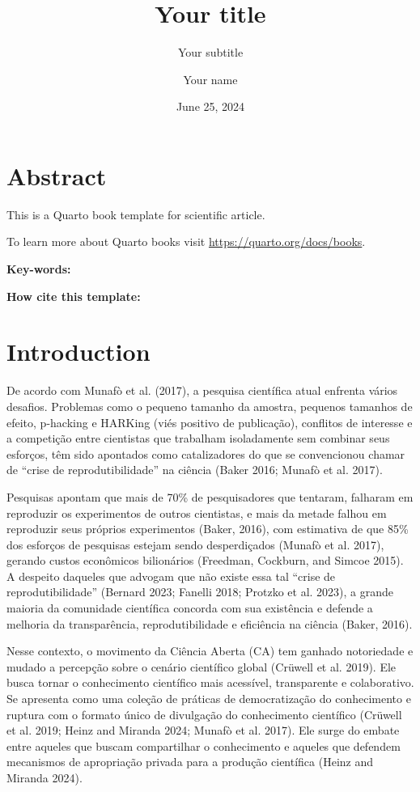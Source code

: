 \documentclass[
  a4paper,
]{article}
\title{Your title}
\subtitle{Your subtitle}
\author{Your name}
\date{June 25, 2024}
\begin{document}
\maketitle


\section*{Abstract}\label{abstract}


This is a Quarto book template for scientific article.

To learn more about Quarto books visit
\url{https://quarto.org/docs/books}.

\textbf{Key-words:}

\textbf{How cite this template:}


\section{Introduction}\label{introduction}

De acordo com Munafò et al. (2017), a pesquisa científica atual enfrenta
vários desafios. Problemas como o pequeno tamanho da amostra, pequenos
tamanhos de efeito, p-hacking e HARKing (viés positivo de publicação),
conflitos de interesse e a competição entre cientistas que trabalham
isoladamente sem combinar seus esforços, têm sido apontados como
catalizadores do que se convencionou chamar de ``crise de
reprodutibilidade'' na ciência (Baker 2016; Munafò et al. 2017).

Pesquisas apontam que mais de 70\% de pesquisadores que tentaram,
falharam em reproduzir os experimentos de outros cientistas, e mais da
metade falhou em reproduzir seus próprios experimentos (Baker, 2016),
com estimativa de que 85\% dos esforços de pesquisas estejam sendo
desperdiçados (Munafò et al. 2017), gerando custos econômicos
bilionários (Freedman, Cockburn, and Simcoe 2015). A despeito daqueles
que advogam que não existe essa tal ``crise de reprodutibilidade''
(Bernard 2023; Fanelli 2018; Protzko et al. 2023), a grande maioria da
comunidade científica concorda com sua existência e defende a melhoria
da transparência, reprodutibilidade e eficiência na ciência (Baker,
2016).

Nesse contexto, o movimento da Ciência Aberta (CA) tem ganhado
notoriedade e mudado a percepção sobre o cenário científico global
(Crüwell et al. 2019). Ele busca tornar o conhecimento científico mais
acessível, transparente e colaborativo. Se apresenta como uma coleção de
práticas de democratização do conhecimento e ruptura com o formato único
de divulgação do conhecimento científico (Crüwell et al. 2019; Heinz and
Miranda 2024; Munafò et al. 2017). Ele surge do embate entre aqueles que
buscam compartilhar o conhecimento e aqueles que defendem mecanismos de
apropriação privada para a produção científica (Heinz and Miranda 2024).
\end{document}
